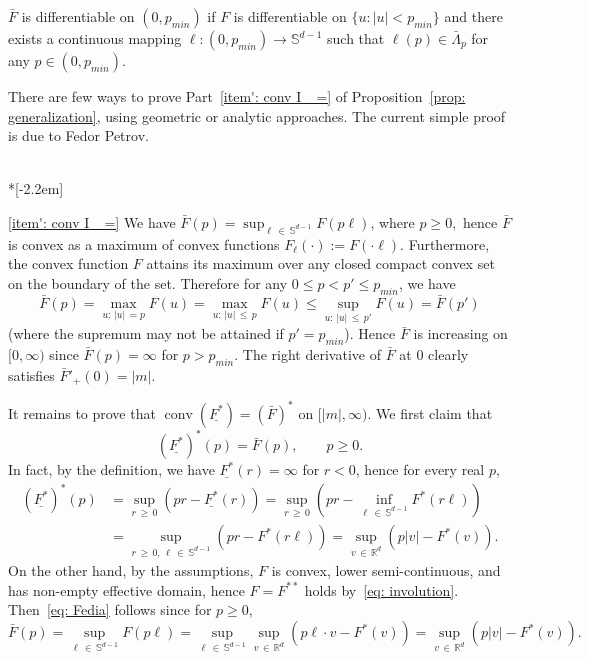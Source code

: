 \documentclass[AHL,Unicode,published]{cedram}
\DeclareMathOperator{\conv}{conv}
\newcommand{\ubar}[1]{\underline{#1}}
\newcommand{\Rbb}{\mathbb{R}}
\newcommand{\Sbb}{\mathbb{S}}
\begin{document}
\begin{coro} \label{cor': condition for diff}
$\bar F$ is differentiable on $(0, p_{min})$ if $F$ is differentiable on $\{u: |u|<p_{min}\}$ and there exists a continuous mapping $\ell: (0, p_{min}) \to \Sbb^{d-1}$ such that $\ell(p) \in \bar \Lambda_p$ for any $p \in (0,p_{min})$.
\end{coro}

There are few ways to prove Part~\eqref{item': conv I_ =} of Proposition~\ref{prop: generalization}, using geometric or analytic approaches. The current simple proof is due to Fedor Petrov.

\begin{proofc}\ \\*[-2.2em]

\eqref{item': conv I_ =} We have $\bar F(p) = \sup_{\ell\,\in\, \Sbb^{d-1}} F(p \ell)$, where $p \ge 0,$ hence $\bar F$ is convex as a maximum of convex functions $F_\ell(\cdot) := F(\cdot \ell)$. Furthermore, the convex function $F$ attains its maximum over any closed compact convex set on the boundary of the set. Therefore for any $0 \le p < p' \le p_{min}$, we have
\[
\bar F(p)=\max_{u:\,|u|\,=p }F(u)=\max_{u:\,|u|\,\le\,p}F(u) \le \sup_{u:\,|u|\,\le\,p'}F(u)=\bar F(p')
\]
(where the supremum may not be attained if $p'=p_{min}$). Hence $\bar F$ is increasing on $[0, \infty)$ since $\bar F(p)=\infty$ for $p> p_{min}$. The right derivative of $\bar F$ at $0$ clearly satisfies $\bar F'_+(0) = |m|$.

It remains to prove that $\conv(\ubar{F^*})= (\bar F)^*$ on $[|m|, \infty)$. We first claim that
\begin{equation}\label{eq: Fedia}
(\ubar{F^*})^*(p) = \bar F(p), \qquad p \ge 0.
\end{equation}
In fact, by the definition, we have $\ubar{F^*} (r)= \infty$ for $r <0$, hence for every real $p$,
\begin{align*}
(\ubar{F^*})^*(p) &= \sup_{r\,\ge\,0} \left(pr - \ubar{F^*}(r) \right) = \sup_{r\,\ge\,0} \left (pr - \inf_{\ell\,\in \,\Sbb^{d-1}} F^*(r \ell) \right) \\
&= \sup_{r\,\ge\,0,\,\ell\,\in\,\Sbb^{d-1}} \left(pr - F^*(r \ell) \right) = \sup_{v\,\in\,\Rbb^d} \left(p |v| - F^*(v) \right).
\end{align*}
On the other hand, by the assumptions, $F$ is convex, lower semi-continuous, and has non-empty effective domain, hence $F=F^{**}$ holds by~\eqref{eq: involution}. Then~\eqref{eq: Fedia} follows since for $p \ge 0$,
\[
\bar F(p) = \sup_{\ell\,\in\,\Sbb^{d-1}} F(p \ell) = \sup_{\ell \,\in\,\Sbb^{d-1}} \sup_{v\,\in\,\Rbb^d} \left(p \ell \cdot v -F^*(v) \right)= \sup_{v\,\in\,\Rbb^d} \left(p |v| - F^*(v) \right).
\]


\end{proofc}
\end{document}
